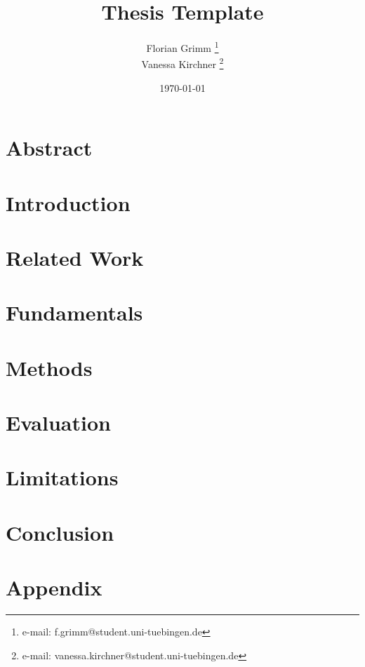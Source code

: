 \documentclass[a4paper,cleardoubleempty,BCOR1cm]{scrbook}
\title{Thesis Template}
\author{Florian Grimm \thanks{e-mail: f.grimm@student.uni-tuebingen.de}\\Vanessa Kirchner \thanks{e-mail: vanessa.kirchner@student.uni-tuebingen.de} }
\date{\today}
\begin{document}


\chapter*{Abstract}



\tableofcontents


\chapter{Introduction}


\chapter{Related Work}
\label{ch:relWork}


\chapter{Fundamentals}
\label{ch:fundamentals}


\chapter{Methods}
\label{ch:methods}



\chapter{Evaluation}
\label{ch:eval}



\chapter{Limitations}
\label{ch:limitations}

\chapter{Conclusion}
\label{ch:conclusion}



\appendix
\chapter{Appendix}




% 
%
%
%

\end{document}
